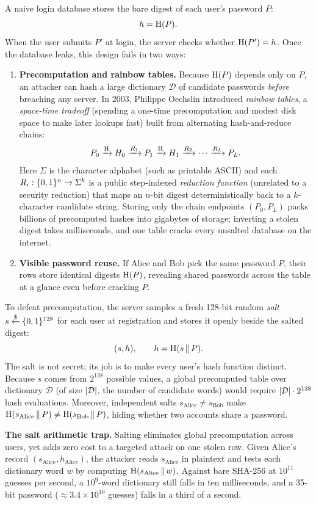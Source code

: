 A naive login database stores the bare digest of each user's password $P$:
\[
  h = \operatorname{H}(P).
\]
When the user submits $P'$ at login, the server checks whether $\operatorname{H}(P') = h$. Once the database leaks, this design fails in two ways:

\begin{enumerate}
  \item \textbf{Precomputation and rainbow tables.} Because $\operatorname{H}(P)$ depends only on $P$, an attacker can hash a large dictionary $\mathcal{D}$ of candidate passwords \emph{before} breaching any server. In 2003, Philippe Oechslin introduced \emph{rainbow tables}, a \emph{space-time tradeoff} (spending a one-time precomputation and modest disk space to make later lookups fast) built from alternating hash-and-reduce chains:
  \[
    P_0 \xrightarrow{\operatorname{H}} H_0 \xrightarrow{R_1} P_1 \xrightarrow{\operatorname{H}} H_1 \xrightarrow{R_2} \cdots \xrightarrow{R_L} P_L.
  \]
  Here $\Sigma$ is the character alphabet (such as printable ASCII) and each $R_i : \{0,1\}^n \to \Sigma^k$ is a public step-indexed \emph{reduction function} (unrelated to a security reduction) that maps an $n$-bit digest deterministically back to a $k$-character candidate string. Storing only the chain endpoints $(P_0, P_L)$ packs billions of precomputed hashes into gigabytes of storage; inverting a stolen digest takes milliseconds, and one table cracks every unsalted database on the internet.
  \item \textbf{Visible password reuse.} If Alice and Bob pick the same password $P$, their rows store identical digests $\operatorname{H}(P)$, revealing shared passwords across the table at a glance even before cracking $P$.
\end{enumerate}

To defeat precomputation, the server samples a fresh 128-bit random \emph{salt} $s \stackrel{\$}{\gets} \{0,1\}^{128}$ for each user at registration and stores it openly beside the salted digest:
\[
  (s, h), \qquad h = \operatorname{H}(s \,\|\, P).
\]
The salt is not secret; its job is to make every user's hash function distinct. Because $s$ comes from $2^{128}$ possible values, a global precomputed table over dictionary $\mathcal{D}$ (of size $\lvert\mathcal{D}\rvert$, the number of candidate words) would require $\lvert\mathcal{D}\rvert \cdot 2^{128}$ hash evaluations. Moreover, independent salts $s_{\text{Alice}} \ne s_{\text{Bob}}$ make $\operatorname{H}(s_{\text{Alice}} \,\|\, P) \ne \operatorname{H}(s_{\text{Bob}} \,\|\, P)$, hiding whether two accounts share a password.

\begin{trapbox}
\textbf{The salt arithmetic trap.} Salting eliminates global precomputation across users, yet adds zero cost to a targeted attack on one stolen row. Given Alice's record $(s_{\text{Alice}}, h_{\text{Alice}})$, the attacker reads $s_{\text{Alice}}$ in plaintext and tests each dictionary word $w$ by computing $\operatorname{H}(s_{\text{Alice}} \,\|\, w)$. Against bare SHA-256 at $10^{11}$ guesses per second, a $10^9$-word dictionary still falls in ten milliseconds, and a 35-bit password ($\approx 3.4 \times 10^{10}$ guesses) falls in a third of a second.
\end{trapbox}

